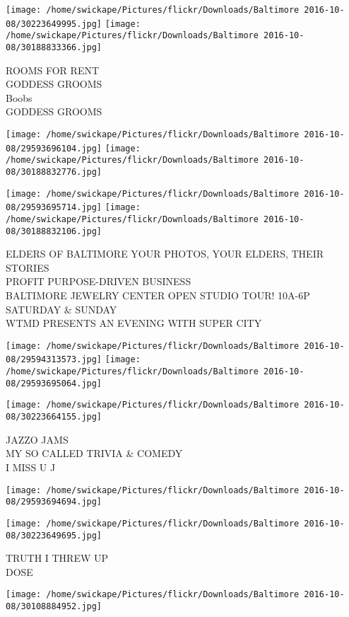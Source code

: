 \documentclass[10pt,letterpaper]{article}
\begin{document}
\texttt{[image: /home/swickape/Pictures/flickr/Downloads/Baltimore 2016-10-08/30223649995.jpg]}
\texttt{[image: /home/swickape/Pictures/flickr/Downloads/Baltimore 2016-10-08/30188833366.jpg]}

ROOMS FOR RENT\\
GODDESS GROOMS\\
Boobs\\
GODDESS GROOMS
\pagebreak

\texttt{[image: /home/swickape/Pictures/flickr/Downloads/Baltimore 2016-10-08/29593696104.jpg]}
\texttt{[image: /home/swickape/Pictures/flickr/Downloads/Baltimore 2016-10-08/30188832776.jpg]}

\texttt{[image: /home/swickape/Pictures/flickr/Downloads/Baltimore 2016-10-08/29593695714.jpg]}
\texttt{[image: /home/swickape/Pictures/flickr/Downloads/Baltimore 2016-10-08/30188832106.jpg]}

ELDERS OF BALTIMORE YOUR PHOTOS, YOUR ELDERS, THEIR STORIES\\
PROFIT PURPOSE{-}DRIVEN BUSINESS\\
BALTIMORE JEWELRY CENTER OPEN STUDIO TOUR!  10A{-}6P SATURDAY \& SUNDAY\\
WTMD PRESENTS AN EVENING WITH SUPER CITY
\pagebreak

\texttt{[image: /home/swickape/Pictures/flickr/Downloads/Baltimore 2016-10-08/29594313573.jpg]}
\texttt{[image: /home/swickape/Pictures/flickr/Downloads/Baltimore 2016-10-08/29593695064.jpg]}

\texttt{[image: /home/swickape/Pictures/flickr/Downloads/Baltimore 2016-10-08/30223664155.jpg]}

JAZZO JAMS\\
MY SO CALLED TRIVIA \& COMEDY\\
I MISS U J
\pagebreak

\texttt{[image: /home/swickape/Pictures/flickr/Downloads/Baltimore 2016-10-08/29593694694.jpg]}

\vspace{0.25in}
\texttt{[image: /home/swickape/Pictures/flickr/Downloads/Baltimore 2016-10-08/30223649695.jpg]}

TRUTH I THREW UP\\
DOSE
\pagebreak

\texttt{[image: /home/swickape/Pictures/flickr/Downloads/Baltimore 2016-10-08/30108884952.jpg]}
\end{document}
